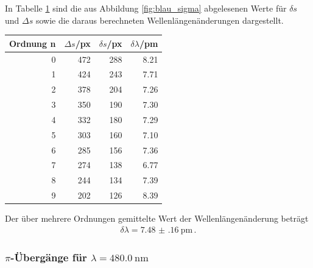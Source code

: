 \documentclass[captions=tableheading]{scrartcl}
\begin{document}
In Tabelle \ref{tab:blausigmamessung} sind die aus Abbildung \ref{fig:blau_sigma} abgelesenen Werte für $\delta s$ und $\Delta s$ sowie die daraus berechneten Wellenlängenänderungen dargestellt.
\begin{table}[H]
	\centering
	\label{tab:blausigmamessung}
	\begin{tabular}{r r r r}
			\toprule
			Ordnung n & $\Delta s$/px & $\delta s$/px & $\delta \lambda$/pm \\
			\midrule
			0 & 472 & 288 & 8.21 \\
			1 & 424 & 243 & 7.71 \\
			2 & 378 & 204 & 7.26 \\
			3 & 350 & 190 & 7.30 \\
			4 & 332 & 180 & 7.29 \\
			5 & 303 & 160 & 7.10 \\
			6 & 285 & 156 & 7.36 \\
			7 & 274 & 138 & 6.77 \\
			8 & 244 & 134 & 7.39 \\
			9 & 202 & 126 & 8.39 \\
			\bottomrule
	\end{tabular}
\end{table}
Der über mehrere Ordnungen gemittelte Wert der Wellenlängenänderung beträgt
\begin{align}
\delta \lambda = \SI{7.48(16)}{\pico\metre}\,.
\end{align}
\subsubsection{$\pi$-Übergänge für $\lambda=\SI{480.0}{\nano\metre}$}
\end{document}

